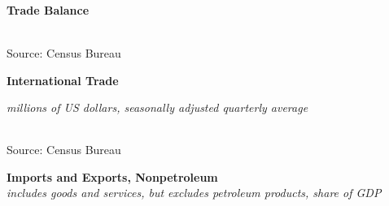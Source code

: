 \documentclass{report}
\makeatletter
\newcommand{\tbllink}[1]{\href{https://raw.githubusercontent.com/bdecon/US-chartbook/master/chartbook/data/#1}{\faTable}}
\newcommand*\short[1]{\expandafter\@gobbletwo\number\numexpr#1\relax}
\newcommand{\ltdateaxisticks}{
		date coordinates in=x, axis line style={draw=none},
		xmax={2023-10-01},
		max space between ticks=40,	    
		xtick={{2013-01-01}, {2014-01-01}, {2015-01-01}, {2016-01-01}, {2017-01-01}, {2018-01-01}, 
		    {2019-01-01}, {2020-01-01}, {2021-01-01}, {2022-01-01}, {2023-01-01}, {2024-01-01}},
		enlarge y limits={0.06}, enlarge x limits={0.01},
		}
\newcommand{\stdline}[4]{\addplot[very thick, no markers, color=#1] 
		table [x=#2, y=#3, col sep=comma] {#4};	}
\newcommand{\rbar}{
		\fill[color=black!10] (axis cs:{2020-02-01},\pgfkeysvalueof{/pgfplots/ymin}) rectangle 
			(axis cs:{2020-05-01}, \pgfkeysvalueof{/pgfplots/ymax});}
\makeatother
\begin{document}
{\begin{minipage}{0.325\textwidth}
\normalsize \textbf{Trade Balance}\footnotesize\\
\hspace*{-5mm} \\
\footnotesize{Source: Census Bureau} \hfill \tbllink{tradelt.csv}
\end{minipage} \hspace{5mm}
\begin{minipage}{0.39\textwidth}
\small 
\end{minipage}
\vspace{3mm}

\begin{minipage}{0.76\textwidth}
\normalsize \textbf{International Trade}\\
\footnotesize{\textit{millions of US dollars, seasonally adjusted \hspace{42mm} quarterly average}\\
\hspace*{-4mm}  \setlength{\tabcolsep}{2.6pt} \color{black!90}
		{\renewcommand{\arraystretch}{1.6}
\begin{tabular}{p{24mm} R{13.5mm} R{14mm} R{14mm} R{14mm} R{14mm} R{14mm}} %
			  \hline
		\end{tabular}}}
\vspace{-1.5mm}		
		
\footnotesize{Source: Census Bureau} \hfill \tbllink{trade_mo_summary.csv}
\end{minipage}
\newpage
\begin{minipage}{0.76\textwidth}
\small 
\vspace{1mm}

\normalsize \textbf{Imports and Exports, Nonpetroleum}\\
\footnotesize{\textit{includes goods and services, but excludes petroleum products, share of GDP}}\vspace{2.8cm}


\end{minipage}}
\end{document}
